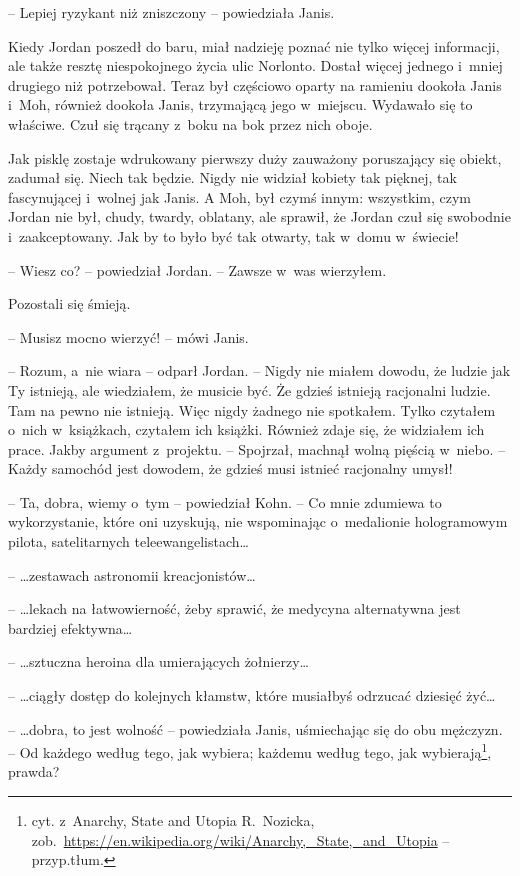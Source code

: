 \documentclass[oneside,polish,11pt,sfheadings]{mwbk}
\begin{document}
-- Lepiej ryzykant niż zniszczony -- powiedziała Janis.

Kiedy Jordan poszedł do baru, miał nadzieję poznać nie tylko więcej
informacji, ale także resztę niespokojnego życia ulic Norlonto. Dostał
więcej jednego i~mniej drugiego niż potrzebował. Teraz był częściowo
oparty na ramieniu dookoła Janis i~Moh, również dookoła Janis,
trzymającą jego w~miejscu. Wydawało się to właściwe. Czuł się trącany z~boku na bok przez nich oboje.

Jak pisklę zostaje wdrukowany pierwszy duży zauważony poruszający się
obiekt, zadumał się. Niech tak będzie. Nigdy nie widział kobiety tak
pięknej, tak fascynującej i~wolnej jak Janis. A Moh, był czymś innym:
wszystkim, czym Jordan nie był, chudy, twardy, oblatany, ale sprawił, że
Jordan czuł się swobodnie i~zaakceptowany. Jak by to było być tak
otwarty, tak w~domu w~świecie!

-- Wiesz co? -- powiedział Jordan. -- Zawsze w~was wierzyłem.

Pozostali się śmieją.

-- Musisz mocno wierzyć! -- mówi Janis.

-- Rozum, a~nie wiara -- odparł Jordan. -- Nigdy nie miałem dowodu, że
ludzie jak Ty istnieją, ale wiedziałem, że musicie być. Że gdzieś
istnieją racjonalni ludzie. Tam na pewno nie istnieją. Więc nigdy
żadnego nie spotkałem. Tylko czytałem o~nich w~książkach, czytałem ich
książki. Również zdaje się, że widziałem ich prace. Jakby argument z~projektu. -- Spojrzał, machnął wolną pięścią w~niebo. -- Każdy samochód
jest dowodem, że gdzieś musi istnieć racjonalny umysł!

-- Ta, dobra, wiemy o~tym -- powiedział Kohn. -- Co mnie zdumiewa to
wykorzystanie, które oni uzyskują, nie wspominając o~medalionie
hologramowym pilota, satelitarnych teleewangelistach\ldots

-- \ldots zestawach astronomii kreacjonistów\ldots

-- \ldots lekach na łatwowierność, żeby sprawić, że medycyna alternatywna
jest bardziej efektywna\ldots

-- \ldots sztuczna heroina dla umierających żołnierzy\ldots

-- \ldots ciągły dostęp do kolejnych kłamstw, które musiałbyś odrzucać
dziesięć żyć\ldots

-- \ldots dobra, to jest wolność -- powiedziała Janis, uśmiechając się do obu
mężczyzn. -- Od każdego według tego, jak wybiera; każdemu według tego,
jak wybierają\footnote{cyt. z~Anarchy, State and Utopia
R.~Nozicka,
zob.~\url{https://en.wikipedia.org/wiki/Anarchy,\_State,\_and\_Utopia}
-- przyp.tłum.}, prawda? 
\end{document}

